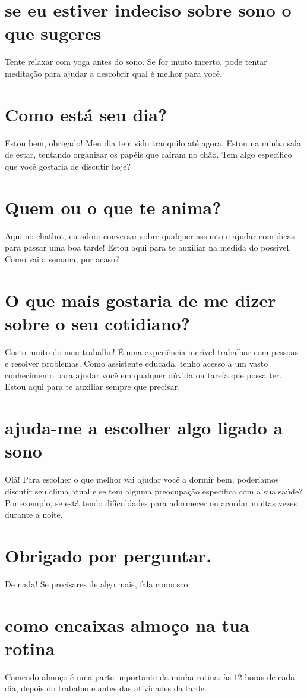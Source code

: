 \documentclass[11pt,a4paper]{article}
\begin{document}
\section{se eu estiver indeciso sobre sono o que sugeres}
Tente relaxar com yoga antes do sono. Se for muito incerto, pode tentar meditação para ajudar a descobrir qual é melhor para você.

\section{Como está seu dia?}
Estou bem, obrigado! Meu dia tem sido tranquilo até agora. Estou na minha sala de estar, tentando organizar os papéis que caíram no chão. Tem algo específico que você gostaria de discutir hoje?

\section{Quem ou o que te anima?}
Aqui no chatbot, eu adoro conversar sobre qualquer assunto e ajudar com dicas para passar uma boa tarde! Estou aqui para te auxiliar na medida do possível. Como vai a semana, por acaso?

\section{O que mais gostaria de me dizer sobre o seu cotidiano?}
Gosto muito do meu trabalho! É uma experiência incrível trabalhar com pessoas e resolver problemas. Como assistente educada, tenho acesso a um vasto conhecimento para ajudar você em qualquer dúvida ou tarefa que possa ter. Estou aqui para te auxiliar sempre que precisar.

\section{ajuda-me a escolher algo ligado a sono}
Olá! Para escolher o que melhor vai ajudar você a dormir bem, poderíamos discutir seu clima atual e se tem alguma preocupação específica com a sua saúde? Por exemplo, se está tendo dificuldades para adormecer ou acordar muitas vezes durante a noite.

\section{Obrigado por perguntar.}
De nada! Se precisares de algo mais, fala connosco.

\section{como encaixas almoço na tua rotina}
Comendo almoço é uma parte importante da minha rotina: às 12 horas de cada dia, depois do trabalho e antes das atividades da tarde.
\end{document}

